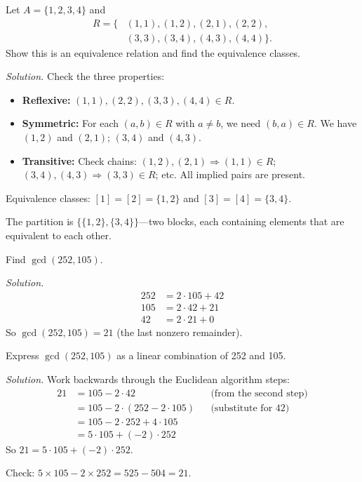 \begin{example}
Let $A = \{1, 2, 3, 4\}$ and
\[
\begin{aligned}
R = \{&(1,1), (1,2), (2,1), (2,2),\\
     &(3,3), (3,4), (4,3), (4,4)\}.
\end{aligned}
\]
Show this is an equivalence relation and find the equivalence classes.

\emph{Solution.} Check the three properties:
\begin{itemize}
  \item \textbf{Reflexive:} $(1,1), (2,2), (3,3), (4,4) \in R$. \checkmark
  \item \textbf{Symmetric:} For each $(a,b) \in R$ with $a \neq b$, we need $(b,a) \in R$. We have $(1,2)$ and $(2,1)$; $(3,4)$ and $(4,3)$. \checkmark
  \item \textbf{Transitive:} Check chains: $(1,2), (2,1) \Rightarrow (1,1) \in R$; $(3,4), (4,3) \Rightarrow (3,3) \in R$; etc. All implied pairs are present. \checkmark
\end{itemize}

Equivalence classes: $[1] = [2] = \{1, 2\}$ and $[3] = [4] = \{3, 4\}$.

The partition is $\{\{1,2\}, \{3,4\}\}$---two blocks, each containing elements that are equivalent to each other.
\end{example}

\begin{example}
Find $\gcd(252, 105)$.

\emph{Solution.}
\begin{align*}
252 &= 2 \cdot 105 + 42 \\
105 &= 2 \cdot 42 + 21 \\
42 &= 2 \cdot 21 + 0
\end{align*}
So $\gcd(252, 105) = 21$ (the last nonzero remainder).
\end{example}

\begin{example}
Express $\gcd(252, 105)$ as a linear combination of 252 and 105.

\emph{Solution.} Work backwards through the Euclidean algorithm steps:
\begin{align*}
21 &= 105 - 2 \cdot 42 && \text{(from the second step)}\\
   &= 105 - 2 \cdot (252 - 2 \cdot 105) && \text{(substitute for 42)}\\
   &= 105 - 2 \cdot 252 + 4 \cdot 105 \\
   &= 5 \cdot 105 + (-2) \cdot 252
\end{align*}
So $21 = 5 \cdot 105 + (-2) \cdot 252$.

Check: $5 \times 105 - 2 \times 252 = 525 - 504 = 21$. \checkmark
\end{example}

